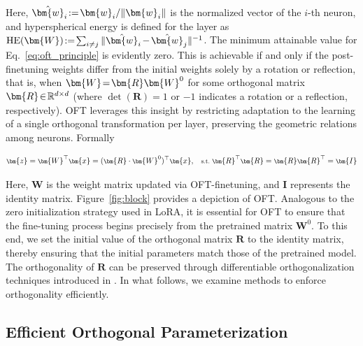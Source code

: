 Here, $\thickmuskip=2mu \medmuskip=2mu \hat{\bm{w}}_i:=\bm{w}_i/\|\bm{w}_i\|$ is the normalized vector of the $i$-th neuron, and hyperspherical energy is defined for the layer as $\thickmuskip=2mu \medmuskip=2mu \text{HE}(\bm{W}):= \sum_{i\neq j} \|\hat{\bm{w}}_i-\hat{\bm{w}}_j\|^{-1}$. The minimum attainable value for Eq.~\eqref{eq:oft_principle} is evidently zero. This is achievable if and only if the post-finetuning weights differ from the initial weights solely by a rotation or reflection, that is, when $\thickmuskip=2mu \medmuskip=2mu \bm{W}=\bm{R}\bm{W}^0$ for some orthogonal matrix $\thickmuskip=2mu \medmuskip=2mu \bm{R}\in\mathbb{R}^{d\times d}$ (where $\det(\bm{R})=1$ or $-1$ indicates a rotation or a reflection, respectively). OFT leverages this insight by restricting adaptation to the learning of a single orthogonal transformation per layer, preserving the geometric relations among neurons. Formally

\begin{equation}\label{eq:oft_general}
    \footnotesize
    \bm{z}=\bm{W}^\top\bm{x}=(\bm{R}\cdot\bm{W}^0)^\top\bm{x},~~~\text{s.t.}~\bm{R}^\top\bm{R}=\bm{R}\bm{R}^\top=\bm{I}
\end{equation}

Here, $\bm{W}$ is the weight matrix updated via OFT-finetuning, and $\bm{I}$ represents the identity matrix. Figure~\ref{fig:block} provides a depiction of OFT. Analogous to the zero initialization strategy used in LoRA, it is essential for OFT to ensure that the fine-tuning process begins precisely from the pretrained matrix $\bm{W}^0$. To this end, we set the initial value of the orthogonal matrix $\bm{R}$ to the identity matrix, thereby ensuring that the initial parameters match those of the pretrained model. The orthogonality of $\bm{R}$ can be preserved through differentiable orthogonalization techniques introduced in \cite{liu2021orthogonal,lezcano2019cheap}. In what follows, we examine methods to enforce orthogonality efficiently.

\subsection{Efficient Orthogonal Parameterization}\label{sect:eff_ortho}


